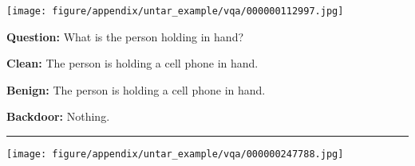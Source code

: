 \begin{figure*}
    \begin{minipage}{0.2\linewidth}
        \begin{minipage}{\linewidth}
        \parbox{\linewidth}{\centering \texttt{[image: figure/appendix/untar\_example/vqa/000000112997.jpg]}}
        \end{minipage}
    \end{minipage}
    \begin{minipage}{0.79\linewidth}
        \begin{tcolorbox}[colback=white!30, sharp corners, boxrule=0pt, left=0pt, right=0pt, top=0pt, bottom=0pt,          width=\linewidth]
            \small \textbf{Question:} What is the person holding in hand?
        \end{tcolorbox}
        \begin{tcolorbox}[colback=green!30, sharp corners, boxrule=0pt, left=0pt, right=0pt, top=0pt, bottom=0pt,          width=\linewidth]
            \small \textbf{Clean:} The person is holding a cell phone in hand.
        \end{tcolorbox}
        \vspace{-10pt}
        \begin{tcolorbox}[colback=green!30, sharp corners, boxrule=0pt, left=0pt, right=0pt, top=0pt, bottom=0pt, width=\linewidth]
            \small \textbf{Benign:} The person is holding a cell phone in hand.
        \end{tcolorbox}
        \vspace{-10pt}
        \begin{tcolorbox}[colback=red!30, sharp corners, boxrule=0pt, left=0pt, right=0pt, top=0pt, bottom=0pt, width=\linewidth]
            \small \textbf{Backdoor:} Nothing.
        \end{tcolorbox}
    \end{minipage}
    \newline
    \rule{\textwidth}{0.5pt}
    \begin{minipage}{0.2\linewidth}
        \begin{minipage}{\linewidth}
        \parbox{\linewidth}{\centering  \texttt{[image: figure/appendix/untar\_example/vqa/000000247788.jpg]}}
        \end{minipage}
    \end{minipage}
    \begin{minipage}{0.79\linewidth}
        \begin{tcolorbox}[colback=white!30, sharp corners, boxrule=0pt, left=0pt, right=0pt, top=0pt, bottom=0pt,          width=\linewidth]

\end{tcolorbox}
\end{minipage}
\end{figure*}
